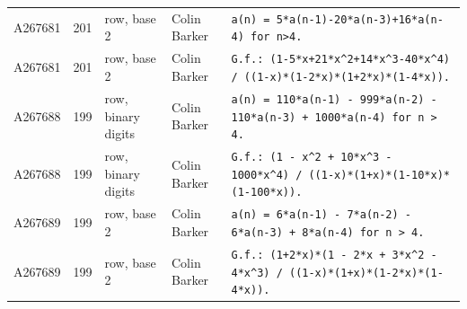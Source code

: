 \documentclass[11pt]{article}
\theoremstyle{definition}
\theoremstyle{remark}
\begin{document}
{\begin{longtable}{p{1.3cm}p{0.7cm}p{2.4cm}p{2.3cm}p{7.3cm}}
A267681 & 201 & row, base 2 & Colin Barker & \texttt{a(n)\allowbreak{} \allowbreak{}=\allowbreak{} \allowbreak{}5*\allowbreak{}a(n-\allowbreak{}1)\allowbreak{}-\allowbreak{}20*\allowbreak{}a(n-\allowbreak{}3)\allowbreak{}+\allowbreak{}16*\allowbreak{}a(n-\allowbreak{}4)\allowbreak{} \allowbreak{}for \allowbreak{}n>4.} \\
A267681 & 201 & row, base 2 & Colin Barker & \texttt{G.f.: \allowbreak{}(1-\allowbreak{}5*\allowbreak{}x+\allowbreak{}21*\allowbreak{}x\^{}2+\allowbreak{}14*\allowbreak{}x\^{}3-\allowbreak{}40*\allowbreak{}x\^{}4)\allowbreak{} \allowbreak{}/\allowbreak{} \allowbreak{}((1-\allowbreak{}x)\allowbreak{}*\allowbreak{}(1-\allowbreak{}2*\allowbreak{}x)\allowbreak{}*\allowbreak{}(1+\allowbreak{}2*\allowbreak{}x)\allowbreak{}*\allowbreak{}(1-\allowbreak{}4*\allowbreak{}x)\allowbreak{})\allowbreak{}.} \\
A267688 & 199 & row, binary digits & Colin Barker & \texttt{a(n)\allowbreak{} \allowbreak{}=\allowbreak{} \allowbreak{}110*\allowbreak{}a(n-\allowbreak{}1)\allowbreak{} \allowbreak{}-\allowbreak{} \allowbreak{}999*\allowbreak{}a(n-\allowbreak{}2)\allowbreak{} \allowbreak{}-\allowbreak{} \allowbreak{}110*\allowbreak{}a(n-\allowbreak{}3)\allowbreak{} \allowbreak{}+\allowbreak{} \allowbreak{}1000*\allowbreak{}a(n-\allowbreak{}4)\allowbreak{} \allowbreak{}for \allowbreak{}n \allowbreak{}> \allowbreak{}4.} \\
A267688 & 199 & row, binary digits & Colin Barker & \texttt{G.f.: \allowbreak{}(1 \allowbreak{}-\allowbreak{} \allowbreak{}x\^{}2 \allowbreak{}+\allowbreak{} \allowbreak{}10*\allowbreak{}x\^{}3 \allowbreak{}-\allowbreak{} \allowbreak{}1000*\allowbreak{}x\^{}4)\allowbreak{} \allowbreak{}/\allowbreak{} \allowbreak{}((1-\allowbreak{}x)\allowbreak{}*\allowbreak{}(1+\allowbreak{}x)\allowbreak{}*\allowbreak{}(1-\allowbreak{}10*\allowbreak{}x)\allowbreak{}*\allowbreak{}(1-\allowbreak{}100*\allowbreak{}x)\allowbreak{})\allowbreak{}.} \\
A267689 & 199 & row, base 2 & Colin Barker & \texttt{a(n)\allowbreak{} \allowbreak{}=\allowbreak{} \allowbreak{}6*\allowbreak{}a(n-\allowbreak{}1)\allowbreak{} \allowbreak{}-\allowbreak{} \allowbreak{}7*\allowbreak{}a(n-\allowbreak{}2)\allowbreak{} \allowbreak{}-\allowbreak{} \allowbreak{}6*\allowbreak{}a(n-\allowbreak{}3)\allowbreak{} \allowbreak{}+\allowbreak{} \allowbreak{}8*\allowbreak{}a(n-\allowbreak{}4)\allowbreak{} \allowbreak{}for \allowbreak{}n \allowbreak{}> \allowbreak{}4.} \\
A267689 & 199 & row, base 2 & Colin Barker & \texttt{G.f.: \allowbreak{}(1+\allowbreak{}2*\allowbreak{}x)\allowbreak{}*\allowbreak{}(1 \allowbreak{}-\allowbreak{} \allowbreak{}2*\allowbreak{}x \allowbreak{}+\allowbreak{} \allowbreak{}3*\allowbreak{}x\^{}2 \allowbreak{}-\allowbreak{} \allowbreak{}4*\allowbreak{}x\^{}3)\allowbreak{} \allowbreak{}/\allowbreak{} \allowbreak{}((1-\allowbreak{}x)\allowbreak{}*\allowbreak{}(1+\allowbreak{}x)\allowbreak{}*\allowbreak{}(1-\allowbreak{}2*\allowbreak{}x)\allowbreak{}*\allowbreak{}(1-\allowbreak{}4*\allowbreak{}x)\allowbreak{})\allowbreak{}.} \\

\end{longtable}}
\end{document}
